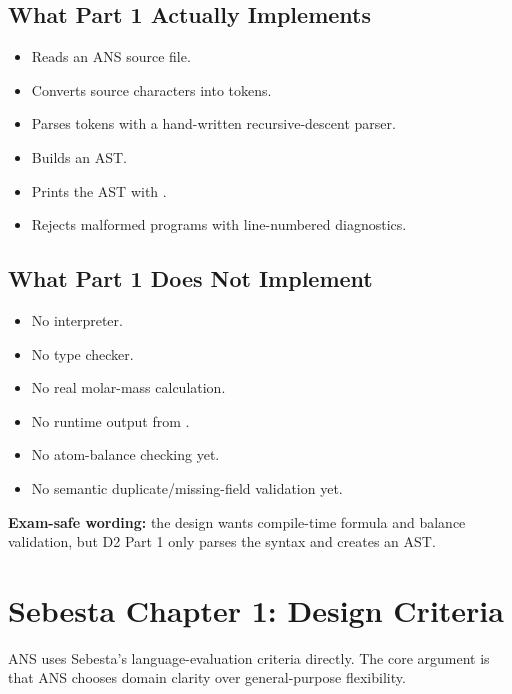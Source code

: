 \documentclass[11pt,a4paper]{article}
\newcommand{\code}[1]{\texttt{\detokenize{#1}}}
\newcommand{\important}[1]{\textbf{\color{ansred}#1}}
\begin{document}
\subsection{What Part 1 Actually Implements}

\begin{itemize}
  \item Reads an ANS source file.
  \item Converts source characters into tokens.
  \item Parses tokens with a hand-written recursive-descent parser.
  \item Builds an AST.
  \item Prints the AST with \code{--dump-ast}.
  \item Rejects malformed programs with line-numbered diagnostics.
\end{itemize}

\subsection{What Part 1 Does Not Implement}

\begin{itemize}
  \item No interpreter.
  \item No type checker.
  \item No real molar-mass calculation.
  \item No runtime output from \code{print}.
  \item No atom-balance checking yet.
  \item No semantic duplicate/missing-field validation yet.
\end{itemize}

\important{Exam-safe wording:} the design wants compile-time formula and balance validation, but D2 Part 1 only parses the syntax and creates an AST.

\section{Sebesta Chapter 1: Design Criteria}

ANS uses Sebesta's language-evaluation criteria directly. The core argument is that ANS chooses domain clarity over general-purpose flexibility.
\end{document}
